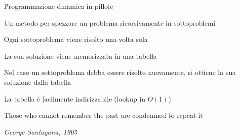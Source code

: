 \begin{frame}{Programmazione dinamica in pillole}

\BIL
\item Un metodo per spezzare un problema ricorsivamente in sottoproblemi
\item Ogni sottoproblema viene risolto una volta sola
\item La sua soluzione viene memorizzata in una tabella
\item Nel caso un sottoproblema debba essere risolto nuovamente, si ottiene la
  sua soluzione dalla tabella
\item La tabella è facilmente indirizzabile (lookup in $O(1)$)
\EIL
    
\epigraph{\alert{Those who cannot remember the past are condemned to repeat it}
}{\textit{George Santayana, 1905}}

\end{frame}



